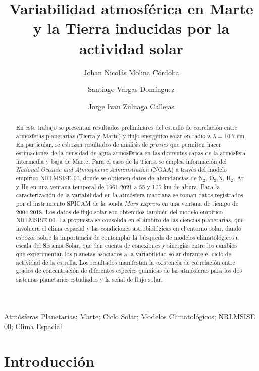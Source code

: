 \documentclass[a4paper,alpha-refs]{eSpectra}
\title{Variabilidad atmosf\'erica en Marte y la Tierra inducidas por la actividad solar}
\author[1,\authfn{1},]{Johan Nicolás Molina Córdoba}
\author[1]{Santiago Vargas Domínguez}
\author[2]{Jorge Ivan Zuluaga Callejas}
\affil[1]{Observatorio Astronómico Nacional, Universidad Nacional de Colombia, Bogotá D.C., Colombia}
\affil[2]{Instituto de Física, Universidad de Antioquia, Medellín, Colombia}
\begin{document}
\begin{frontmatter}
\maketitle
\begin{abstract}
En este trabajo se presentan resultados preliminares del estudio de correlaci\'on entre atm\'osferas planetarias (Tierra y Marte) y flujo energ\'etico solar en radio a $\lambda = 10.7$ cm. En particular, se esbozan resultados de an\'alisis  de \textit{proxies} que permiten hacer estimaciones de la densidad de agua atmosf\'erica en las diferentes capas de la atm\'osfera intermedia y baja de Marte. Para el caso de la Tierra se emplea información del \textit{National Oceanic and Atmospheric Administration} (NOAA) a trav\'es del modelo emp\'irico NRLMSISE 00, donde se obtienen datos de abundancias de N$_2$, O$_2$,N, H$_2$, Ar y He en una ventana temporal de 1961-2021 a 55 y 105 km de altura.  Para la caracterizaci\'on de la variabilidad en la atm\'osfera marciana se toman datos registrados por el instrumento SPICAM de la sonda \textit{Mars Express} en una ventana de tiempo de 2004-2018. Los datos de flujo solar son obtenidos tambi\'en del modelo emp\'irico NRLMSISE 00. La propuesta se consolida en el \'ambito de las ciencias planetarias, que involucra el clima espacial y las condiciones astrobiol\'ogicas en el entorno solar, dando esbozos sobre la importancia de contemplar la b\'usqueda de modelos climatol\'ogicos a escala del Sistema Solar, que den cuenta de conexiones y sinergias entre los cambios que experimentan los planetas asociados a la variabilidad solar durante el ciclo de actividad de la estrella. Los resultados manifestan la existencia de correlación entre grados de concentración de diferentes especies químicas de las atmósferas para los dos sistemas planetarios estudiados  y la señal de flujo solar. %
\end{abstract}

\begin{keywords}
Atmósferas Planetarias; Marte; Ciclo Solar; Modelos Climatológicos; NRLMSISE 00; Clima Espacial. 
\end{keywords}
\end{frontmatter}

\section{Introducción}
\end{document}
